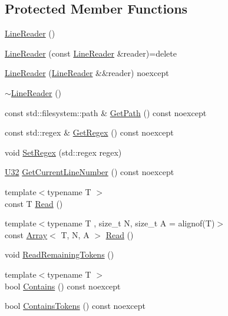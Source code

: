\subsection*{Protected Member Functions}
\begin{DoxyCompactItemize}
\item 
\mbox{\hyperlink{classmage_1_1_line_reader_ab4a46321d7ea3ecda2d6390c78a7285b}{Line\+Reader}} ()
\item 
\mbox{\hyperlink{classmage_1_1_line_reader_ae4f871bebae110704b34c0bd88460639}{Line\+Reader}} (const \mbox{\hyperlink{classmage_1_1_line_reader}{Line\+Reader}} \&reader)=delete
\item 
\mbox{\hyperlink{classmage_1_1_line_reader_ae90c546a98e113a48ca1c94b854a4866}{Line\+Reader}} (\mbox{\hyperlink{classmage_1_1_line_reader}{Line\+Reader}} \&\&reader) noexcept
\item 
\mbox{\hyperlink{classmage_1_1_line_reader_ad9753ea392ebe5b3867852d3392fb1e7}{$\sim$\+Line\+Reader}} ()
\item 
const std\+::filesystem\+::path \& \mbox{\hyperlink{classmage_1_1_line_reader_a9740b3cecdcf5a27c696a08eef3b09da}{Get\+Path}} () const noexcept
\item 
const std\+::regex \& \mbox{\hyperlink{classmage_1_1_line_reader_a7e4e6f6e41dc07d34ce93022e2f7e401}{Get\+Regex}} () const noexcept
\item 
void \mbox{\hyperlink{classmage_1_1_line_reader_a1f564ab424c7a906cd0bf2e7bf550bb9}{Set\+Regex}} (std\+::regex regex)
\item 
\mbox{\hyperlink{namespacemage_a41c104c036fba3756a74e19f793eeaa1}{U32}} \mbox{\hyperlink{classmage_1_1_line_reader_aa0ed768e2799b74f2341c56fc6ac4969}{Get\+Current\+Line\+Number}} () const noexcept
\item 
{\footnotesize template$<$typename T $>$ }\\const T \mbox{\hyperlink{classmage_1_1_line_reader_a9bbad433ab93ce012aec7155adafbedb}{Read}} ()
\item 
{\footnotesize template$<$typename T , size\+\_\+t N, size\+\_\+t A = alignof(\+T)$>$ }\\const \mbox{\hyperlink{structmage_1_1_array}{Array}}$<$ T, N, A $>$ \mbox{\hyperlink{classmage_1_1_line_reader_a208eb25a7715761178317eec72c93c75}{Read}} ()
\item 
void \mbox{\hyperlink{classmage_1_1_line_reader_aa12f309eaa7aace705ff4e0199c4fbfc}{Read\+Remaining\+Tokens}} ()
\item 
{\footnotesize template$<$typename T $>$ }\\bool \mbox{\hyperlink{classmage_1_1_line_reader_a89a31254af144fd0c9e7f684cdaa28e7}{Contains}} () const noexcept
\item 
bool \mbox{\hyperlink{classmage_1_1_line_reader_aeb88e4082cfe3ae1ff84a82fcde26298}{Contains\+Tokens}} () const noexcept
\end{DoxyCompactItemize}
